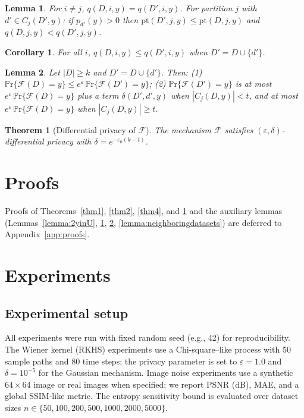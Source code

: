 \documentclass[journal,transmag]{IEEEtran}
\newtheorem{theorem}{Theorem}%
\newtheorem{lemma}{Lemma}
\newtheorem{corollary}{Corollary}
\begin{document}
\begin{lemma}\label{lemma4:djparittion}
For $i \neq j$, $q(D,i,y) = q(D',i,y)$. For partition $j$ with $d' \in C_j(D',y)$: if $p_{d'}(y)>0$ then $\mathrm{pt}(D',j,y) \leq \mathrm{pt}(D,j,y)$ and $q(D,j,y) < q(D',j,y)$.
\end{lemma}

\begin{corollary}\label{corollary:ismallthan0}
For all $i$, $q(D,i,y) \leq q(D',i,y)$ when $D' = D \cup \{d'\}$.
\end{corollary}

\begin{lemma}\label{lemma5:random1}
Let $|D| \geq k$ and $D' = D \cup \{d'\}$. Then: (1) $\mathbb{P}\mathrm{r}\{\mathcal{F}(D)=y\} \leq e^\varepsilon\,\mathbb{P}\mathrm{r}\{\mathcal{F}(D')=y\}$; (2) $\mathbb{P}\mathrm{r}\{\mathcal{F}(D')=y\}$ is at most $e^\varepsilon\,\mathbb{P}\mathrm{r}\{\mathcal{F}(D)=y\}$ plus a term $\delta(D',d',y)$ when $|C_j(D,y)|<t$, and at most $e^\varepsilon\,\mathbb{P}\mathrm{r}\{\mathcal{F}(D)=y\}$ when $|C_j(D,y)| \geq t$.
\end{lemma}

\begin{theorem}[Differential privacy of $\mathcal{F}$]\label{thm5}
The mechanism $\mathcal{F}$ satisfies $(\varepsilon,\delta)$-differential privacy with $\delta = e^{-\varepsilon_0(k-t)}$.
\end{theorem}

\ifCLASSOPTIONcaptionsoff
  \newpage
\fi

\section{Proofs}
Proofs of Theorems~\ref{thm1}, \ref{thm2}, \ref{thm4}, and \ref{thm5} and the auxiliary lemmas (Lemmas~\ref{lemma:2yinU}, \ref{lemma4:djparittion}, \ref{lemma5:random1}, \ref{lemma:neighboringdatasets}) are deferred to Appendix~\ref{app:proofs}.

\section{Experiments}

\subsection{Experimental setup}
All experiments were run with fixed random seed (e.g., 42) for reproducibility. The Wiener kernel (RKHS) experiments use a Chi-square--like process with 50 sample paths and 80 time steps; the privacy parameter is set to $\varepsilon = 1.0$ and $\delta = 10^{-5}$ for the Gaussian mechanism. Image noise experiments use a synthetic $64 \times 64$ image or real images when specified; we report PSNR (dB), MAE, and a global SSIM-like metric. The entropy sensitivity bound is evaluated over dataset sizes $n \in \{50, 100, 200, 500, 1000, 2000, 5000\}$.
\end{document}
